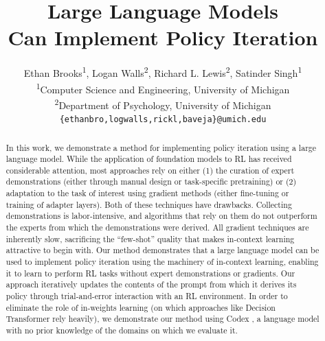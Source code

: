 \documentclass{article}
\title{Large Language Models \\ Can Implement Policy Iteration}
\author{
Ethan Brooks\textsuperscript{\rm 1},
Logan Walls\textsuperscript{\rm 2},
Richard L. Lewis\textsuperscript{\rm 2},
Satinder Singh\textsuperscript{\rm 1} \\
\textsuperscript{\rm 1}Computer Science and Engineering, University
of Michigan \\
\textsuperscript{\rm 2}Department of Psychology, University of Michigan \\
\texttt{\{ethanbro,logwalls,rickl,baveja\}@umich.edu} \\
}
\begin{document}
\maketitle
\begin{abstract}
  In this work, we demonstrate a method for implementing policy iteration using
  a large language model. While the application of foundation models to RL has
  received considerable attention, most approaches rely on either (1) the
  curation of expert demonstrations (either through manual design or
  task-specific pretraining) or (2) adaptation to the task of interest using
  gradient methods (either fine-tuning or training of adapter layers). Both of
  these techniques have drawbacks. Collecting demonstrations is labor-intensive,
  and algorithms that rely on them do not outperform the experts from which the
  demonstrations were derived. All gradient techniques are inherently slow,
  sacrificing the “few-shot” quality that makes in-context learning attractive
  to begin with. Our method demonstrates that a large language model can be used
  to implement policy iteration using the machinery of in-context learning,
  enabling it to learn to perform RL tasks without expert demonstrations or
  gradients. Our approach iteratively updates the contents of the prompt from
  which it derives its policy through trial-and-error interaction with an RL
  environment. In order to eliminate the role of in-weights learning (on which
  approaches like Decision Transformer rely heavily), we demonstrate our
  method using Codex \parencite{chen2021evaluating}, a language model with no
  prior knowledge of the domains on which we evaluate it.
\end{abstract}
\end{document}
